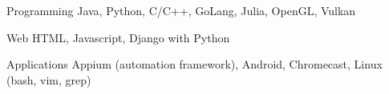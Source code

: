 


\begin{cvskills}


\cvskill
{Programming} %
{Java, Python, C/C++, GoLang, Julia, OpenGL, Vulkan} %


\cvskill
{Web} %
{HTML, Javascript, Django with Python} %


\cvskill
{Applications} %
{Appium (automation framework), Android, Chromecast, Linux (bash, vim, grep)} %


\end{cvskills}
